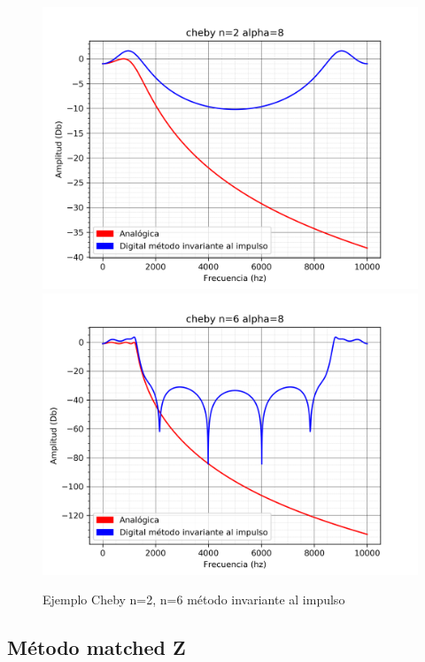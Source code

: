 \documentclass[assd_guia_filtros_recursivos_main.tex]{subfiles}
\begin{document}
\begin{figure}[H]	
	\centering
	\includegraphics[scale=0.4]{output/cheby/alpha=8/cheby_n=2.png}
	\includegraphics[scale=0.4]{output/cheby/alpha=8/cheby_n=6.png}
	\caption{Ejemplo Cheby n=2, n=6 método invariante al impulso}
	\label{fig:Caso 6}
\end{figure}


\subsection{Método matched Z}
\end{document}
